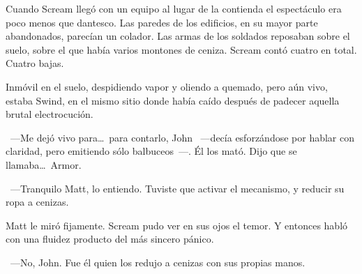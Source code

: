 \parbreak
Cuando Scream llegó con un equipo al lugar de la contienda el espectáculo era poco menos que dantesco. Las paredes de los edificios, en su mayor parte abandonados, parecían un colador. Las armas de los soldados reposaban sobre el suelo, sobre el que había varios montones de ceniza. Scream contó cuatro en total. Cuatro bajas.

Inmóvil en el suelo, despidiendo vapor y oliendo a quemado, pero aún vivo, estaba Swind, en el mismo sitio donde había caído después de padecer aquella brutal electrocución.

~---Me dejó vivo para\dots\ para contarlo, John ~---decía esforzándose por hablar con claridad, pero emitiendo sólo balbuceos~---. Él los mató. Dijo que se llamaba\dots\ Armor.

~---Tranquilo Matt, lo entiendo. Tuviste que activar el mecanismo, y reducir su ropa a cenizas.

Matt le miró fijamente. Scream pudo ver en sus ojos el temor. Y entonces habló con una fluidez producto del más sincero pánico.

~---No, John. Fue él quien los redujo a cenizas con sus propias manos.

\endinput
